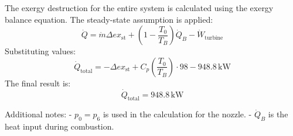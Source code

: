 The exergy destruction for the entire system is calculated using the exergy balance equation. The steady-state assumption is applied:  
\[
\dot{Q} = \dot{m} \Delta ex_{\text{st}} + \left(1 - \frac{T_0}{T_B}\right) \dot{Q}_B - \dot{W}_{\text{turbine}}
\]  
Substituting values:  
\[
\dot{Q}_{\text{total}} = -\Delta ex_{\text{st}} + C_p \left(\frac{T_0}{T_B}\right) \cdot 98 - 948.8 \, \text{kW}
\]  
The final result is:  
\[
\dot{Q}_{\text{total}} = 948.8 \, \text{kW}
\]  

Additional notes:  
- \( p_0 = p_6 \) is used in the calculation for the nozzle.  
- \( \dot{Q}_B \) is the heat input during combustion.